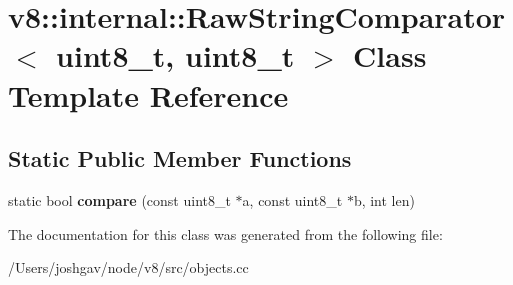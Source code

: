 \hypertarget{classv8_1_1internal_1_1_raw_string_comparator_3_01uint8__t_00_01uint8__t_01_4}{}\section{v8\+:\+:internal\+:\+:Raw\+String\+Comparator$<$ uint8\+\_\+t, uint8\+\_\+t $>$ Class Template Reference}
\label{classv8_1_1internal_1_1_raw_string_comparator_3_01uint8__t_00_01uint8__t_01_4}
\subsection*{Static Public Member Functions}
\begin{DoxyCompactItemize}
\item 
static bool {\bfseries compare} (const uint8\+\_\+t $\ast$a, const uint8\+\_\+t $\ast$b, int len)\hypertarget{classv8_1_1internal_1_1_raw_string_comparator_3_01uint8__t_00_01uint8__t_01_4_a1229fa356a713a56bcf53b9a90d0a58c}{}\label{classv8_1_1internal_1_1_raw_string_comparator_3_01uint8__t_00_01uint8__t_01_4_a1229fa356a713a56bcf53b9a90d0a58c}

\end{DoxyCompactItemize}


The documentation for this class was generated from the following file\+:\begin{DoxyCompactItemize}
\item 
/\+Users/joshgav/node/v8/src/objects.\+cc\end{DoxyCompactItemize}
